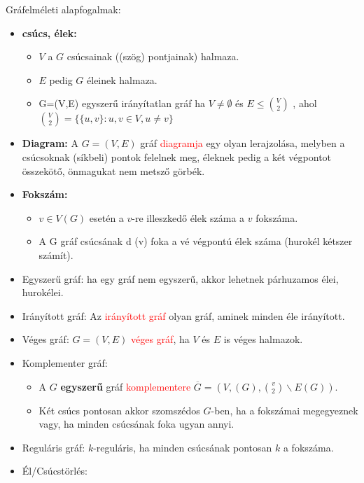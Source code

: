 \documentclass[../../szobeli.tex]{subfiles}
\begin{document}
\begin{center}
    \noindent{}
\end{center}

    Gráfelméleti alapfogalmak: 
    
    \begin{itemize}
        \item \textbf{csúcs, élek:} \begin{itemize}
            \item $V$ a $G$ csúcsainak ((szög) pontjainak) halmaza.
            \item $E$ pedig $G$ éleinek halmaza.
            \item G=(V,E) egyszerű irányítatlan gráf ha $V \neq \emptyset$ és $E \leq \binom{V}{2}$ , ahol $\binom{V}{2} = \{\{u,v\}:u,v\in V,u\neq v\}$
        \end{itemize} 
        \item \textbf{Diagram:} A $G = (V,E)$ gráf \textcolor{red}{diagramja} egy olyan lerajzolása, melyben a csúcsoknak (síkbeli) pontok felelnek meg, éleknek pedig a két végpontot összekötő, önmagukat nem metsző görbék.
        \item \textbf{Fokszám:}\begin{itemize}
            \item $v \in V(G)$  esetén a $v$-re illeszkedő élek száma a $v$ fokszáma.
            \item A G gráf csúcsának d (v) foka a vé végpontú élek száma (hurokél kétszer számít).
        \end{itemize}
        \item Egyszerű gráf: ha egy gráf nem egyszerű, akkor lehetnek párhuzamos élei, hurokélei.
        \item Irányított gráf: Az \textcolor{red}{irányított gráf} olyan gráf, aminek minden éle irányított.
        \item Véges gráf: $G = (V,E)$ \textcolor{red}{véges gráf}, ha $V$ és $E$ is véges halmazok.
        \item Komplementer gráf: \begin{itemize}
            \item A $G$ \textbf{egyszerű} gráf \textcolor{red}{komplementere} $\overline{G} = (V,(G), \binom{v}{2} \backslash E(G))$.
            \item Két csúcs pontosan akkor szomszédos $G$-ben, ha a fokszámai megegyeznek vagy, ha minden csúcsának foka ugyan annyi.
        \end{itemize}
        \item Reguláris gráf: $k$-reguláris, ha minden csúcsának pontosan $k$ a fokszáma.
        \item Él/Csúcstörlés: 
        

\end{itemize}
\end{document}
